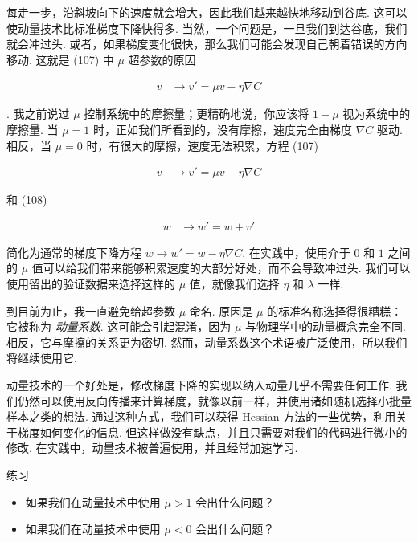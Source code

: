 \noindent 每走一步，沿斜坡向下的速度就会增大，因此我们越来越快地移动到谷底. 这可以使动量技术比标准梯度下降快得多. 当然，一个问题是，一旦我们到达谷底，我们就会冲过头. 或者，如果梯度变化很快，那么我们可能会发现自己朝着错误的方向移动. 这就是 (107) 中 $\mu$ 超参数的原因

\begin{align*}
v &\rightarrow v' = \mu v - \eta \nabla C \nonumber
\end{align*}

\noindent. 我之前说过 $\mu$ 控制系统中的摩擦量；更精确地说，你应该将 $1-\mu$ 视为系统中的摩擦量. 当 $\mu = 1$ 时，正如我们所看到的，没有摩擦，速度完全由梯度 $\nabla C$ 驱动. 相反，当 $\mu = 0$ 时，有很大的摩擦，速度无法积累，方程 (107)

\begin{align*}
v &\rightarrow v' = \mu v - \eta \nabla C \nonumber
\end{align*}

\noindent 和 (108)

\begin{align*}
w &\rightarrow w' = w+v' \nonumber
\end{align*}

\noindent 简化为通常的梯度下降方程 $w \rightarrow w'=w-\eta \nabla C$. 在实践中，使用介于 $0$ 和 $1$ 之间的 $\mu$ 值可以给我们带来能够积累速度的大部分好处，而不会导致冲过头. 我们可以使用留出的验证数据来选择这样的 $\mu$ 值，就像我们选择 $\eta$ 和 $\lambda$ 一样.

到目前为止，我一直避免给超参数 $\mu$ 命名. 原因是 $\mu$ 的标准名称选择得很糟糕：它被称为 \emph{动量系数}. 这可能会引起混淆，因为 $\mu$ 与物理学中的动量概念完全不同. 相反，它与摩擦的关系更为密切. 然而，动量系数这个术语被广泛使用，所以我们将继续使用它.

动量技术的一个好处是，修改梯度下降的实现以纳入动量几乎不需要任何工作. 我们仍然可以使用反向传播来计算梯度，就像以前一样，并使用诸如随机选择小批量样本之类的想法. 通过这种方式，我们可以获得 Hessian 方法的一些优势，利用关于梯度如何变化的信息. 但这样做没有缺点，并且只需要对我们的代码进行微小的修改. 在实践中，动量技术被普遍使用，并且经常加速学习.

\begin{exerciseBox}{练习}

\begin{itemize}

\item 如果我们在动量技术中使用 $\mu > 1$ 会出什么问题？

\item 如果我们在动量技术中使用 $\mu < 0$ 会出什么问题？

\end{itemize}

\end{exerciseBox}

